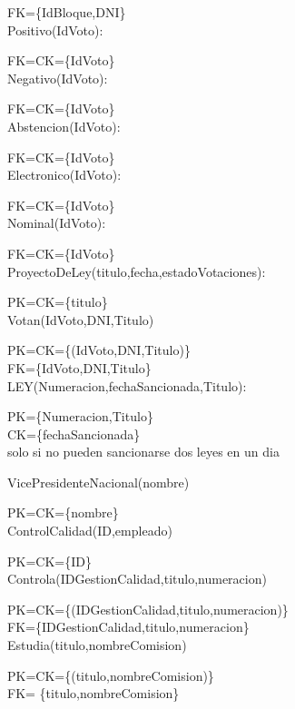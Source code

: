 FK={\{IdBloque,DNI}\}\\

Positivo(IdVoto):

FK=CK={\{IdVoto}\}\\

Negativo(IdVoto):

FK=CK={\{IdVoto}\}\\

Abstencion(IdVoto):

FK=CK={\{IdVoto}\}\\

Electronico(IdVoto):

FK=CK={\{IdVoto}\}\\

Nominal(IdVoto):

FK=CK={\{IdVoto}\}\\

ProyectoDeLey(titulo,fecha,estadoVotaciones):

PK=CK={\{titulo}\}\\

Votan(IdVoto,DNI,Titulo)

PK=CK={\{(IdVoto,DNI,Titulo)}\}\\

FK={\{IdVoto,DNI,Titulo}\}\\

LEY(Numeracion,fechaSancionada,Titulo):

PK={\{Numeracion,Titulo}\}\\

CK={\{fechaSancionada}\}\\ solo si no pueden sancionarse dos leyes en un dia

VicePresidenteNacional(nombre)

PK=CK={\{nombre}\}\\

ControlCalidad(ID,empleado)

PK=CK={\{ID}\}\\

Controla(IDGestionCalidad,titulo,numeracion)

PK=CK={\{(IDGestionCalidad,titulo,numeracion)}\}\\

FK={\{IDGestionCalidad,titulo,numeracion}\}\\

Estudia(titulo,nombreComision)

PK=CK={\{(titulo,nombreComision)}\}\\

FK= {\{titulo,nombreComision}\}\\		